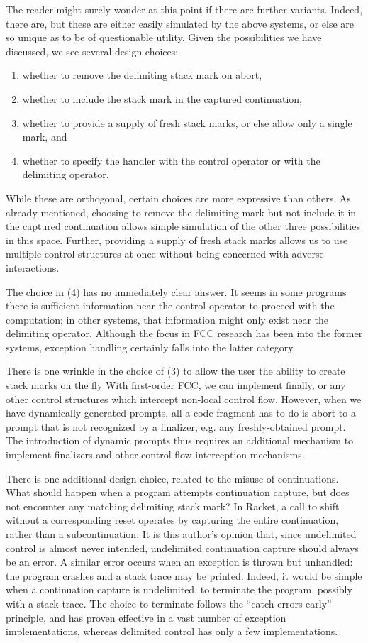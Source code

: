 \documentclass[11pt]{article}
\begin{document}
The reader might surely wonder at this point if there are further variants.
Indeed, there are, but these are either easily simulated by the above systems, or else are so unique as to be of questionable utility.
Given the possibilities we have discussed, we see several design choices:
\begin{enumerate}
\item whether to remove the delimiting stack mark on abort,
\item whether to include the stack mark in the captured continuation,
\item whether to provide a supply of fresh stack marks, or else allow only a single mark, and
\item whether to specify the handler with the control operator or with the delimiting operator.
\end{enumerate}
While these are orthogonal, certain choices are more expressive than others.
As already mentioned, choosing to remove the delimiting mark but not include it in the captured continuation allows simple simulation of the other three possibilities in this space.
Further, providing a supply of fresh stack marks allows us to use multiple control structures at once without being concerned with adverse interactions.

The choice in (4) has no immediately clear answer.
It seems in some programs there is sufficient information near the control operator to proceed with the computation; in other systems, that information might only exist near the delimiting operator.
Although the focus in FCC research has been into the former systems, exception handling certainly falls into the latter category.

There is one wrinkle in the choice of (3) to allow the user the ability to create stack marks on the fly
With first-order FCC, we can implement finally, or any other control structures which intercept non-local control flow.
However, when we have dynamically-generated prompts, all a code fragment has to do is abort to a prompt that is not recognized by a finalizer, e.g. any freshly-obtained prompt.
The introduction of dynamic prompts thus requires an additional mechanism to implement finalizers and other control-flow interception mechanisms.

There is one additional design choice, related to the misuse of continuations.
What should happen when a program attempts continuation capture, but does not encounter any matching delimiting stack mark?
In Racket, a call to shift without a corresponding reset operates by capturing the entire continuation, rather than a subcontinuation.
It is this author's opinion that, since undelimited control is almost never intended, undelimited continuation capture should always be an error.
A similar error occurs when an exception is thrown but unhandled: the program crashes and a stack trace may be printed.
Indeed, it would be simple when a continuation capture is undelimited, to terminate the program, possibly with a stack trace.
The choice to terminate follows the ``catch errors early'' principle, and  has proven effective in a vast number of exception implementations, whereas delimited control has only a few implementations.
\end{document}
